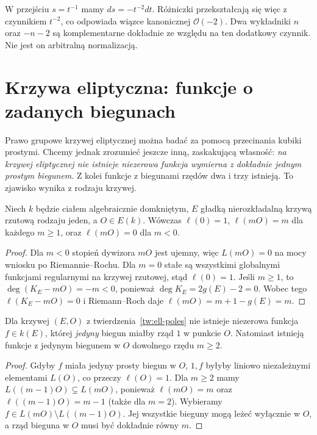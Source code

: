 \begin{uwaga}
W przejściu $s=t^{-1}$ mamy $ds=-t^{-2}dt$.
Różniczki przekształcają się więc z czynnikiem
$t^{-2}$, co odpowiada wiązce kanonicznej
$\mathcal O(-2)$. Dwa wykładniki $n$ oraz $-n-2$
są komplementarne dokładnie ze względu na ten dodatkowy
czynnik. Nie jest on arbitralną normalizacją.
\end{uwaga}

\section{Krzywa eliptyczna: funkcje o zadanych biegunach}
\label{sec:elliptic-poles}

Prawo grupowe krzywej eliptycznej można badać
za pomocą przecinania kubiki prostymi. Chcemy jednak
zrozumieć jeszcze inną, zaskakującą własność:
\emph{na krzywej eliptycznej nie istnieje niezerowa
funkcja wymierna z dokładnie jednym prostym biegunem}.
Z kolei funkcje z biegunami rzędów dwa i trzy istnieją.
To zjawisko wynika z rodzaju krzywej.

\begin{twierdzenie}
\label{tw:ell-poles}
Niech $k$ będzie ciałem algebraicznie domkniętym,
$E$ gładką nierozkładalną krzywą rzutową rodzaju jeden,
a $O\in E(k)$. Wówczas
$\ell(0)=1$, $\ell(mO)=m$ dla każdego $m\ge1$,
oraz $\ell(mO)=0$ dla $m<0$.
\end{twierdzenie}
\begin{proof}
Dla $m<0$ stopień dywizora $mO$ jest ujemny,
więc $L(mO)=0$ na mocy wniosku po Riemannie--Rochu.
Dla $m=0$ stałe są wszystkimi globalnymi funkcjami
regularnymi na krzywej rzutowej, stąd $\ell(0)=1$.
Jeśli $m\ge1$, to $\deg(K_E-mO)=-m<0$,
ponieważ $\deg K_E=2g(E)-2=0$.
Wobec tego $\ell(K_E-mO)=0$ i Riemann--Roch daje
$\ell(mO)=m+1-g(E)=m$.
\end{proof}

\begin{wniosek}
Dla krzywej $(E,O)$ z twierdzenia~\ref{tw:ell-poles}
nie istnieje niezerowa funkcja $f\in k(E)$, której
\emph{jedyny} biegun miałby rząd $1$ w punkcie $O$.
Natomiast istnieją funkcje z jedynym biegunem
w $O$ dowolnego rzędu $m\ge2$.
\end{wniosek}
\begin{proof}
Gdyby $f$ miała jedyny prosty biegun w $O$,
$1,f$ byłyby liniowo niezależnymi elementami $L(O)$,
co przeczy $\ell(O)=1$.
Dla $m\ge2$ mamy
$L((m-1)O)\subsetneq L(mO)$, ponieważ
$\ell(mO)=m$ oraz $\ell((m-1)O)=m-1$
(także dla $m=2$). Wybieramy
$f\in L(mO)\setminus L((m-1)O)$.
Jej wszystkie bieguny mogą leżeć wyłącznie w $O$,
a rząd bieguna w $O$ musi być dokładnie równy $m$.
\end{proof}

